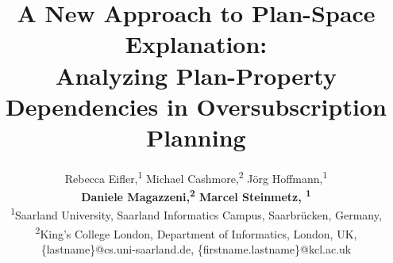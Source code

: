 \documentclass[letterpaper]{article} %
\begin{document}
\title{A New Approach to Plan-Space Explanation:\\ Analyzing Plan-Property Dependencies in Oversubscription Planning}


\author{
Rebecca Eifler,\textsuperscript{\rm 1} 
Michael Cashmore,\textsuperscript{\rm 2}
J\"org Hoffmann,\textsuperscript{\rm 1}\\
\Large \textbf{Daniele Magazzeni,\textsuperscript{\rm 2} 
Marcel Steinmetz, \textsuperscript{\rm 1}} \\
\textsuperscript{\rm 1}Saarland University, Saarland Informatics Campus, Saarbr\"ucken, Germany,\\ 
\textsuperscript{\rm 2}King's College London, Department of Informatics, London, UK,\\ 
\{lastname\}@cs.uni-saarland.de,
\{firstname.lastname\}@kcl.ac.uk 
}

\maketitle
\end{document}
